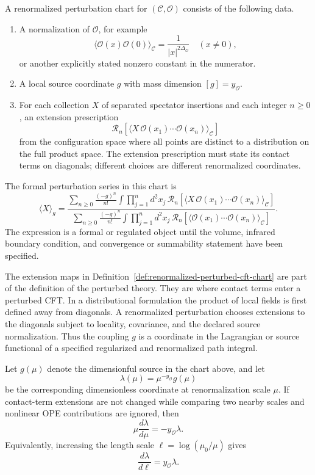 \begin{definition}
\label{def:renormalized-perturbed-cft-chart}
A renormalized perturbation chart for \((\mathcal C,\mathcal O)\) consists of
the following data.

\begin{enumerate}
\item A normalization of \(\mathcal O\), for example
\[
  \langle \mathcal O(x)\mathcal O(0)\rangle_{\mathcal C}
  =
  \frac{1}{|x|^{2\Delta_{\mathcal O}}}
  \quad (x\neq0),
\]
or another explicitly stated nonzero constant in the numerator.
\item A local source coordinate \(g\) with mass dimension
\([g]=y_{\mathcal O}\).
\item For each collection \(X\) of separated spectator insertions and each
integer \(n\ge0\), an extension prescription
\[
  \mathcal R_n\!\left[
  \langle X\,\mathcal O(x_1)\cdots\mathcal O(x_n)\rangle_{\mathcal C}
  \right]
\]
from the configuration space where all points are distinct to a distribution
on the full product space.  The extension prescription must state its contact
terms on diagonals; different choices are different renormalized coordinates.
\end{enumerate}

The formal perturbation series in this chart is
\[
  \langle X\rangle_g
  =
  \frac{
  \sum_{n\ge0}\frac{(-g)^n}{n!}
  \int \prod_{j=1}^n d^2x_j\,
  \mathcal R_n[
  \langle X\,\mathcal O(x_1)\cdots\mathcal O(x_n)\rangle_{\mathcal C}]}
  {\sum_{n\ge0}\frac{(-g)^n}{n!}
  \int \prod_{j=1}^n d^2x_j\,
  \mathcal R_n[
  \langle \mathcal O(x_1)\cdots\mathcal O(x_n)\rangle_{\mathcal C}]} .
\]
The expression is a formal or regulated object until the volume, infrared
boundary condition, and convergence or summability statement have been
specified.
\end{definition}

The extension maps in Definition~\ref{def:renormalized-perturbed-cft-chart}
are part of the definition of the perturbed theory.  They are where contact
terms enter a perturbed CFT.  In a distributional formulation the product of
local fields is first defined away from diagonals.  A renormalized
perturbation chooses extensions to the diagonals subject to locality,
covariance, and the declared source normalization.  Thus the coupling \(g\) is
a coordinate in the Lagrangian or source functional of a specified regularized
and renormalized path integral.

\begin{remark}
\label{rem:first-order-relevant-source-scaling}
Let \(g(\mu)\) denote the dimensionful source in the chart above, and let
\[
  \lambda(\mu)=\mu^{-y_{\mathcal O}}g(\mu)
\]
be the corresponding dimensionless coordinate at renormalization scale
\(\mu\).  If contact-term extensions are not changed while comparing two
nearby scales and nonlinear OPE contributions are ignored, then
\[
  \mu\frac{d\lambda}{d\mu}=-y_{\mathcal O}\lambda .
\]
Equivalently, increasing the length scale \(\ell=\log(\mu_0/\mu)\) gives
\[
  \frac{d\lambda}{d\ell}=y_{\mathcal O}\lambda .
\]
\end{remark}

